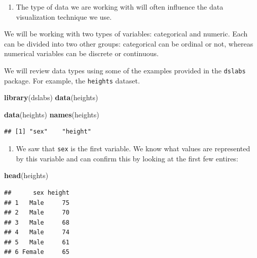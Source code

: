 \documentclass[
]{article}
\newenvironment{Shaded}{\begin{snugshade}}{\end{snugshade}}
\newcommand{\KeywordTok}[1]{\textcolor[rgb]{0.13,0.29,0.53}{\textbf{#1}}}
\newcommand{\NormalTok}[1]{#1}
\providecommand{\tightlist}{%
  \setlength{\itemsep}{0pt}\setlength{\parskip}{0pt}}
\begin{document}
\begin{enumerate}
\def\labelenumi{\arabic{enumi}.}
\tightlist
\item
  The type of data we are working with will often influence the data
  visualization technique we use.
\end{enumerate}

We will be working with two types of variables: categorical and numeric.
Each can be divided into two other groups: categorical can be ordinal or
not, whereas numerical variables can be discrete or continuous.

We will review data types using some of the examples provided in the
\texttt{dslabs} package. For example, the \texttt{heights} dataset.

\begin{Shaded}
\begin{Highlighting}[]
\KeywordTok{library}\NormalTok{(dslabs)}
\KeywordTok{data}\NormalTok{(heights)}
\end{Highlighting}
\end{Shaded}

\begin{Shaded}
\begin{Highlighting}[]
\KeywordTok{data}\NormalTok{(heights)}
\KeywordTok{names}\NormalTok{(heights)}
\end{Highlighting}
\end{Shaded}

\begin{verbatim}
## [1] "sex"    "height"
\end{verbatim}

\begin{enumerate}
\def\labelenumi{\arabic{enumi}.}
\setcounter{enumi}{1}
\tightlist
\item
  We saw that \texttt{sex} is the first variable. We know what values
  are represented by this variable and can confirm this by looking at
  the first few entires:
\end{enumerate}

\begin{Shaded}
\begin{Highlighting}[]
\KeywordTok{head}\NormalTok{(heights)}
\end{Highlighting}
\end{Shaded}

\begin{verbatim}
##      sex height
## 1   Male     75
## 2   Male     70
## 3   Male     68
## 4   Male     74
## 5   Male     61
## 6 Female     65
\end{verbatim}
\end{document}

